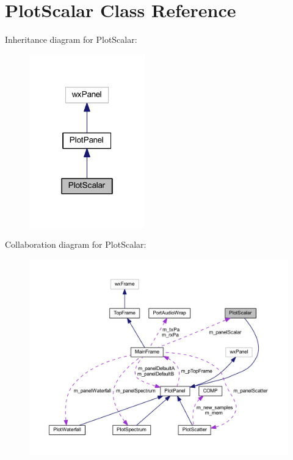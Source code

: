 \hypertarget{class_plot_scalar}{\section{Plot\-Scalar Class Reference}
\label{class_plot_scalar}
}


Inheritance diagram for Plot\-Scalar\-:
\nopagebreak
\begin{figure}[H]
\begin{center}
\leavevmode
\includegraphics[width=142pt]{class_plot_scalar__inherit__graph}
\end{center}
\end{figure}


Collaboration diagram for Plot\-Scalar\-:
\nopagebreak
\begin{figure}[H]
\begin{center}
\leavevmode
\includegraphics[width=350pt]{class_plot_scalar__coll__graph}
\end{center}
\end{figure}
